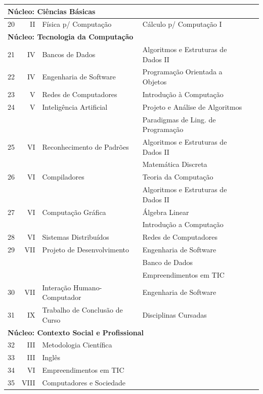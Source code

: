 \documentclass[
	12pt,				%
	openright,			%
  oneside,     %
	a4paper,			%
	chapter=TITLE,		%
	english,			%
	french,				%
	spanish,			%
	brazil				%
	]{abntex2}
\begin{document}
\begin{apendicesenv}
\begin{landscape}
\begin{longtable}{r|r|l|l|l}
\multicolumn{5}{l}{\textbf{Núcleo: Ciências Básicas}} \\ \hline
    20    & II    & Física p/ Computação & Cálculo p/ Computação I &        \\ \hline

\multicolumn{5}{l}{\textbf{Núcleo: Tecnologia da Computação}} \\ \hline
    21    & IV    & Bancos de Dados & Algoritmos e Estruturas de Dados II &        \\ \hline
    22    & IV    & Engenharia de Software & Programação Orientada a Objetos &       \\ \hline
    23    & V     & Redes de Computadores & Introdução à Computação &       \\ \hline
    24    & V     & Inteligência Artificial & Projeto e Análise de Algoritmos &       \\ 
          &       &       & Paradigmas de Ling. de Programação &          \\ \hline
    25    & VI    & Reconhecimento de Padrões &  Algoritmos e Estruturas de Dados II &  \\
          &       &       & Matemática Discreta &       \\ \hline
    26    & VI    & Compiladores & Teoria da Computação &       \\ 
              &       &       & Algoritmos e Estruturas de Dados II &         \\ \hline
    27    & VI    & Computação Gráfica & Álgebra Linear &        \\ 
          &       &       & Introdução a Computação &         \\ \hline
    28    & VI    & Sistemas Distribuídos & Redes de Computadores &        \\ \hline
    29    & VII   & Projeto de Desenvolvimento & Engenharia de Software &   \\ 
          &       &       & Banco de Dados &        \\ 
          &       &       & Empreendimentos em TIC &        \\ \hline
    30    & VII   & Interação Humano-Computador & Engenharia de Software &        \\ \hline
    31    & IX    & Trabalho de Conclusão de Curso & Disciplinas Cursadas &       \\ \hline

\multicolumn{5}{l}{\textbf{Núcleo: Contexto Social e Profissional}} \\ \hline
    32    & III   & Metodologia Científica &       &       \\ \hline
    33    & III   & Inglês &       &        \\ \hline
    34    & VI    & Empreendimentos em TIC &       &        \\ \hline
    35    & VIII  & Computadores e Sociedade &       &        \\ \hline



\end{longtable}
\end{landscape}
\end{apendicesenv}
\end{document}
